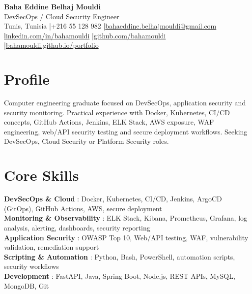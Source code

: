 \documentclass[a4paper,10pt]{article}
\begin{document}
\begin{center}
{\LARGE\bfseries\color{navy} Baha Eddine Belhaj Mouldi}\\[4pt]
{\large DevSecOps / Cloud Security Engineer}\\[6pt]
Tunis, Tunisia \quad|\quad +216 55 128 982 \quad|\quad \href{mailto:bahaeddine.belhajmouldi@gmail.com}{bahaeddine.belhajmouldi@gmail.com}\\[2pt]
\href{https://www.linkedin.com/in/bahamouldi}{linkedin.com/in/bahamouldi} \quad|\quad \href{https://github.com/bahamouldi}{github.com/bahamouldi} \quad|\quad \href{https://bahamouldi.github.io/portfolio/}{bahamouldi.github.io/portfolio}
\end{center}
\vspace{3pt}
\section{Profile}
Computer engineering graduate focused on DevSecOps, application security and security monitoring. Practical experience with Docker, Kubernetes, CI/CD concepts, GitHub Actions, Jenkins, ELK Stack, AWS exposure, WAF engineering, web/API security testing and secure deployment workflows. Seeking DevSecOps, Cloud Security or Platform Security roles.
\section{Core Skills}
\textbf{DevSecOps \& Cloud} : Docker, Kubernetes, CI/CD, Jenkins, ArgoCD (GitOps), GitHub Actions, AWS, secure deployment\\[1pt]
\textbf{Monitoring \& Observability} : ELK Stack, Kibana, Prometheus, Grafana, log analysis, alerting, dashboards, security reporting\\[1pt]
\textbf{Application Security} : OWASP Top 10, Web/API testing, WAF, vulnerability validation, remediation support\\[1pt]
\textbf{Scripting \& Automation} : Python, Bash, PowerShell, automation scripts, security workflows\\[1pt]
\textbf{Development} : FastAPI, Java, Spring Boot, Node.js, REST APIs, MySQL, MongoDB, Git
\end{document}
